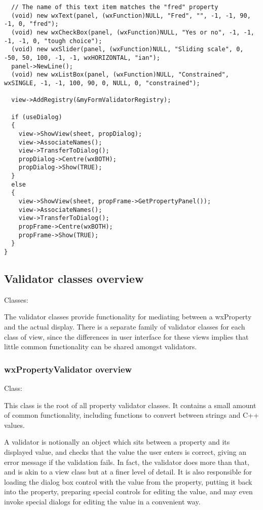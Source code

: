 \begin{verbatim}
  // The name of this text item matches the "fred" property
  (void) new wxText(panel, (wxFunction)NULL, "Fred", "", -1, -1, 90, -1, 0, "fred");
  (void) new wxCheckBox(panel, (wxFunction)NULL, "Yes or no", -1, -1, -1, -1, 0, "tough choice");
  (void) new wxSlider(panel, (wxFunction)NULL, "Sliding scale", 0, -50, 50, 100, -1, -1, wxHORIZONTAL, "ian");
  panel->NewLine();
  (void) new wxListBox(panel, (wxFunction)NULL, "Constrained", wxSINGLE, -1, -1, 100, 90, 0, NULL, 0, "constrained");

  view->AddRegistry(&myFormValidatorRegistry);

  if (useDialog)
  {
    view->ShowView(sheet, propDialog);
    view->AssociateNames();
    view->TransferToDialog();
    propDialog->Centre(wxBOTH);
    propDialog->Show(TRUE);
  }
  else
  {
    view->ShowView(sheet, propFrame->GetPropertyPanel());
    view->AssociateNames();
    view->TransferToDialog();
    propFrame->Centre(wxBOTH);
    propFrame->Show(TRUE);
  }
}
\end{verbatim}

\subsection{Validator classes overview}\label{proplistvalidatoroverview}

Classes: 

The validator classes provide functionality for mediating between a wxProperty and
the actual display. There is a separate family of validator classes for each
class of view, since the differences in user interface for these views implies
that little common functionality can be shared amongst validators.



\subsubsection{wxPropertyValidator overview}\label{wxpropertyvalidatoroverview}

Class: 

This class is the root of all property validator classes. It contains a small
amount of common functionality, including functions to convert between
strings and C++ values.

A validator is notionally an object which sits between a property and its displayed
value, and checks that the value the user enters is correct, giving an error message
if the validation fails. In fact, the validator does more than that, and is akin to
a view class but at a finer level of detail. It is also responsible for
loading the dialog box control with the value from the property, putting it back
into the property, preparing special controls for editing the value, and
may even invoke special dialogs for editing the value in a convenient way.

